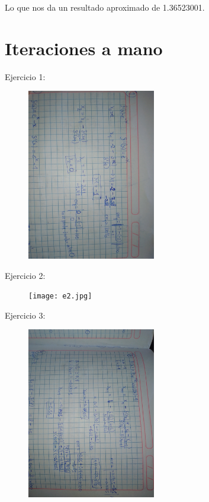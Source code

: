 \documentclass[a4paper,12pt]{article}
\begin{document}
    Lo que nos da un resultado aproximado de 1.36523001.
    \clearpage
    \section{Iteraciones a mano}
    Ejercicio 1:
    \begin{figure}[h]
        \centering
        \includegraphics[width=0.5\textwidth,angle=90]{e1.jpg}
    \end{figure}
    
    Ejercicio 2:
    \begin{figure}[h]
        \centering
        \texttt{[image: e2.jpg]}
    \end{figure}
    \newpage
    Ejercicio 3:
    \begin{figure}[h]
        \centering
        \includegraphics[width=0.5\textwidth,angle=90]{e3.jpg}
    \end{figure}
    
\end{document}
